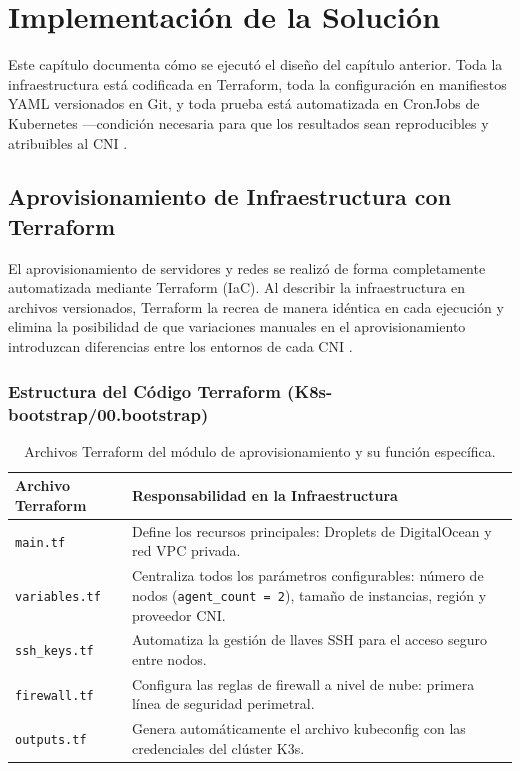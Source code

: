\section{Implementación de la Solución}

Este capítulo documenta cómo se ejecutó el diseño del capítulo anterior. Toda la infraestructura está codificada en Terraform, toda la configuración en manifiestos YAML versionados en Git, y toda prueba está automatizada en CronJobs de Kubernetes ---condición necesaria para que los resultados sean reproducibles y atribuibles al CNI \cite{ref7}.

\subsection{Aprovisionamiento de Infraestructura con Terraform}

El aprovisionamiento de servidores y redes se realizó de forma completamente automatizada mediante Terraform (IaC). Al describir la infraestructura en archivos versionados, Terraform la recrea de manera idéntica en cada ejecución y elimina la posibilidad de que variaciones manuales en el aprovisionamiento introduzcan diferencias entre los entornos de cada CNI \cite{ref7}.

\subsubsection{Estructura del Código Terraform (K8s-bootstrap/00.bootstrap)}

\begin{table}[htbp]
\centering
\scriptsize
\renewcommand{\arraystretch}{1.25}
\setlength{\tabcolsep}{4pt}
\caption{Archivos Terraform del módulo de aprovisionamiento y su función específica.}
\label{tab:terraform-aprovisionamiento}
\begin{tabularx}{\textwidth}{|l|Y|}
\hline
\textbf{Archivo Terraform} & \textbf{Responsabilidad en la Infraestructura} \\
\hline
\texttt{main.tf} & Define los recursos principales: Droplets de DigitalOcean y red VPC privada. \\
\hline
\texttt{variables.tf} & Centraliza todos los parámetros configurables: número de nodos (\texttt{agent\_count = 2}), tamaño de instancias, región y proveedor CNI. \\
\hline
\texttt{ssh\_keys.tf} & Automatiza la gestión de llaves SSH para el acceso seguro entre nodos. \\
\hline
\texttt{firewall.tf} & Configura las reglas de firewall a nivel de nube: primera línea de seguridad perimetral. \\
\hline
\texttt{outputs.tf} & Genera automáticamente el archivo kubeconfig con las credenciales del clúster K3s. \\
\hline
\end{tabularx}
\end{table}

